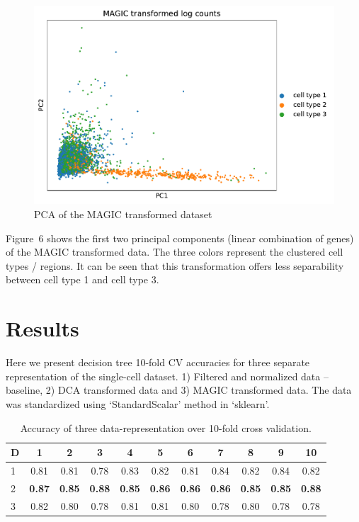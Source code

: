 \begin{figure}
\includegraphics[width=\linewidth]{pca_magic_log_counts.pdf}
\caption{PCA of the MAGIC transformed dataset}
\end{figure}

Figure~6 shows the first two principal components (linear combination of genes) of the MAGIC transformed data. The three colors represent the clustered cell types / regions. It can be seen that this transformation offers less separability between cell type 1 and cell type 3.

\section*{Results}

Here we present decision tree 10-fold CV accuracies for three separate representation of the single-cell dataset. 1) Filtered and normalized data -- baseline, 2) DCA transformed data and 3) MAGIC transformed data. The data was standardized using `StandardScalar' method in `sklearn'.

\begin{table}[!hbtp]
\begin{tabular}{|l|c|c|c|c|c|c|c|c|c|c|}
\hline
\textbf{D} & \textbf{1} & \textbf{2} & \textbf{3} & \textbf{4} & \textbf{5} & \textbf{6} & \textbf{7} & \textbf{8} & \textbf{9} & \textbf{10} \\\hline
1 & 0.81 & 0.81 & 0.78 & 0.83 & 0.82 & 0.81 & 0.84 & 0.82 & 0.84 & 0.82 \\
2 & \textbf{0.87} & \textbf{0.85} & \textbf{0.88} & \textbf{0.85} & \textbf{0.86} & \textbf{0.86} & \textbf{0.86} & \textbf{0.85} & \textbf{0.85} & \textbf{0.88} \\
3 & 0.82 & 0.80 & 0.78 & 0.81 & 0.81 & 0.80 & 0.78 & 0.80 & 0.78 & 0.78 \\\hline
\end{tabular}
\caption{Accuracy of three data-representation over 10-fold cross validation.}
\end{table}

